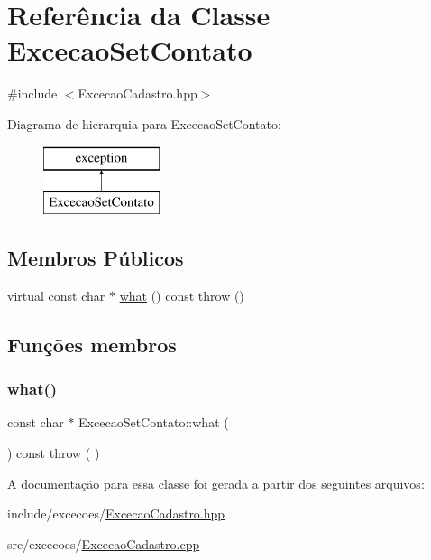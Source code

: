 \hypertarget{class_excecao_set_contato}{}\section{Referência da Classe Excecao\+Set\+Contato}
\label{class_excecao_set_contato}


{\ttfamily \#include $<$Excecao\+Cadastro.\+hpp$>$}

Diagrama de hierarquia para Excecao\+Set\+Contato\+:\begin{figure}[H]
\begin{center}
\leavevmode
\includegraphics[height=2.000000cm]{class_excecao_set_contato}
\end{center}
\end{figure}
\subsection*{Membros Públicos}
\begin{DoxyCompactItemize}
\item 
virtual const char $\ast$ \mbox{\hyperlink{class_excecao_set_contato_a7b99858f639444ec92b0f974760cade0}{what}} () const  throw ()
\end{DoxyCompactItemize}


\subsection{Funções membros}
\mbox{\label{class_excecao_set_contato_a7b99858f639444ec92b0f974760cade0}} 
\subsubsection{\texorpdfstring{what()}{what()}}
{\footnotesize\ttfamily const char $\ast$ Excecao\+Set\+Contato\+::what (\begin{DoxyParamCaption}{ }\end{DoxyParamCaption}) const throw ( ) \hspace{0.3cm}{\ttfamily [virtual]}}



A documentação para essa classe foi gerada a partir dos seguintes arquivos\+:\begin{DoxyCompactItemize}
\item 
include/excecoes/\mbox{\hyperlink{_excecao_cadastro_8hpp}{Excecao\+Cadastro.\+hpp}}\item 
src/excecoes/\mbox{\hyperlink{_excecao_cadastro_8cpp}{Excecao\+Cadastro.\+cpp}}\end{DoxyCompactItemize}
